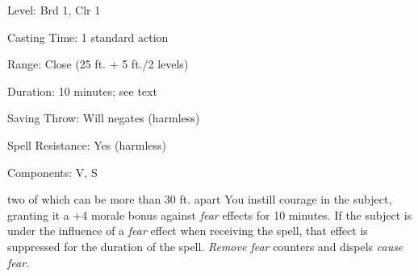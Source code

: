 
\begin{description*}
\item[Level:] Brd 1, Clr 1
\item[Casting Time:] 1 standard action
\item[Range:] Close (25 ft. + 5 ft./2 levels)
\item[Duration:] 10 minutes; see text
\item[Saving Throw:] Will negates (harmless)
\item[Spell Resistance:] Yes (harmless)
\item[Components:] V, S
\end{description*}

two of which can be more than 30 ft. apart
You instill courage in the subject, granting it a +4 morale bonus against \textit{fear
}effects for 10 minutes. If the subject is under the influence of a \textit{fear
}effect when receiving the spell, that effect is suppressed for the duration of
the spell.
\textit{Remove fear} counters and dispels \textit{cause fear}.
